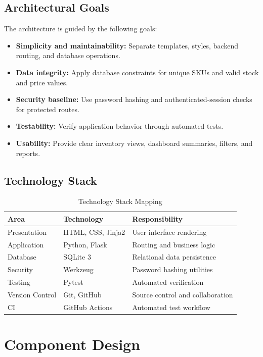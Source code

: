 \documentclass[conference]{IEEEtran}
\begin{document}
\subsection{Architectural Goals}
The architecture is guided by the following goals:
\begin{itemize}
\item \textbf{Simplicity and maintainability:} Separate templates, styles, backend routing, and database operations.
\item \textbf{Data integrity:} Apply database constraints for unique SKUs and valid stock and price values.
\item \textbf{Security baseline:} Use password hashing and authenticated-session checks for protected routes.
\item \textbf{Testability:} Verify application behavior through automated tests.
\item \textbf{Usability:} Provide clear inventory views, dashboard summaries, filters, and reports.
\end{itemize}

\subsection{Technology Stack}

\begin{table}[!t]
\caption{Technology Stack Mapping}
\label{tab:stack}
\centering
\small
\begin{tabularx}{\columnwidth}{l l Y}
\toprule
\textbf{Area} & \textbf{Technology} & \textbf{Responsibility}\\
\midrule
Presentation & HTML, CSS, Jinja2 & User interface rendering\\
Application & Python, Flask & Routing and business logic\\
Database & SQLite 3 & Relational data persistence\\
Security & Werkzeug & Password hashing utilities\\
Testing & Pytest & Automated verification\\
Version Control & Git, GitHub & Source control and collaboration\\
CI & GitHub Actions & Automated test workflow\\
\bottomrule
\end{tabularx}
\end{table}

\section{Component Design}
\end{document}
